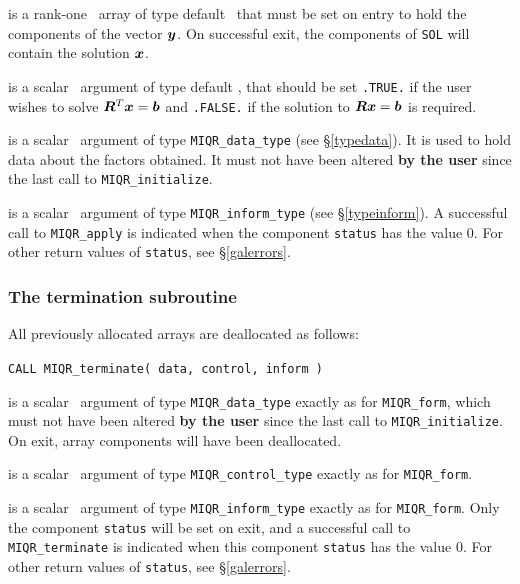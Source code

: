 \documentclass{galahad}
\newcommand{\packagename}{MIQR}
\begin{document}
\vspace*{-3mm}
\begin{description}
 is a rank-one  \intentinout\ array of type default \real\
that must be set on entry to hold the components of the vector ${\bm{y}}$.
On successful exit, the components of {\tt SOL} will contain the solution 
${\bm{x}}$.

 is a scalar \intentin\ argument of type default \logical,
that should be set {\tt .TRUE.} if the user wishes to solve
${\bm{R}}^T {\bm{x}} = {\bm{b}}$ and {\tt .FALSE.} if the solution to 
${\bm{R}} {\bm{x}} = {\bm{b}}$ is required.

 is a scalar \intentinout\ argument of type 
{\tt \packagename\_data\_type}
(see \S\ref{typedata}). It is used to hold data about the factors obtained.
It must not have been altered {\bf by the user} since the last call to 
{\tt \packagename\_initialize}.

 is a scalar \intentout\ argument of type 
{\tt \packagename\_inform\_type}
(see \S\ref{typeinform}). A successful call to {\tt \packagename\_apply} 
is indicated when the  component {\tt status} has the value 0. 
For other return values of {\tt status}, see \S\ref{galerrors}.

\end{description}


\subsubsection{The  termination subroutine}
All previously allocated arrays are deallocated as follows:
\vspace*{1mm}

\hspace{8mm}
{\tt CALL \packagename\_terminate( data, control, inform )}

\begin{description}

 is a scalar \intentinout\ argument of type 
{\tt \packagename\_data\_type} 
exactly as for
{\tt \packagename\_form},
which must not have been altered {\bf by the user} since the last call to 
{\tt \packagename\_initialize}.
On exit, array components will have been deallocated.

 is a scalar \intentin\ argument of type 
{\tt \packagename\_control\_type}
exactly as for
{\tt \packagename\_form}.

 is a scalar \intentout\ argument of type
{\tt \packagename\_inform\_type}
exactly as for
{\tt \packagename\_form}.
Only the component {\tt status} will be set on exit, and a 
successful call to 
{\tt \packagename\_terminate}
is indicated when this  component {\tt status} has the value 0. 
For other return values of {\tt status}, see \S\ref{galerrors}.

\end{description}
\end{document}
